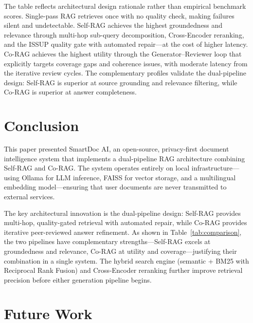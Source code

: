 \documentclass[10pt, conference, a4paper, compsocconf]{IEEEtran}
\begin{document}
The table reflects architectural design rationale rather than empirical
benchmark scores. Single-pass RAG retrieves once with no quality check,
making failures silent and undetectable. Self-RAG achieves the highest
groundedness and relevance through multi-hop sub-query decomposition,
Cross-Encoder reranking, and the ISSUP quality gate with automated
repair---at the cost of higher latency. Co-RAG achieves the highest
utility through the Generator--Reviewer loop that explicitly targets
coverage gaps and coherence issues, with moderate latency from the
iterative review cycles. The complementary profiles validate the
dual-pipeline design: Self-RAG is superior at source grounding and
relevance filtering, while Co-RAG is superior at answer completeness.


\section{Conclusion}

This paper presented SmartDoc AI, an open-source, privacy-first document
intelligence system that implements a dual-pipeline RAG architecture
combining Self-RAG and Co-RAG. The system operates entirely on local
infrastructure---using Ollama for LLM inference, FAISS for vector storage,
and a multilingual embedding model---ensuring that user documents are
never transmitted to external services.

The key architectural innovation is the dual-pipeline design: Self-RAG
provides multi-hop, quality-gated retrieval with automated repair, while
Co-RAG provides iterative peer-reviewed answer refinement. As shown in
Table~\ref{tab:comparison}, the two pipelines have complementary
strengths---Self-RAG excels at groundedness and relevance, Co-RAG at
utility and coverage---justifying their combination in a single system.
The hybrid search engine (semantic + BM25 with Reciprocal Rank Fusion)
and Cross-Encoder reranking further improve retrieval precision before
either generation pipeline begins.


\section{Future Work}
\end{document}
